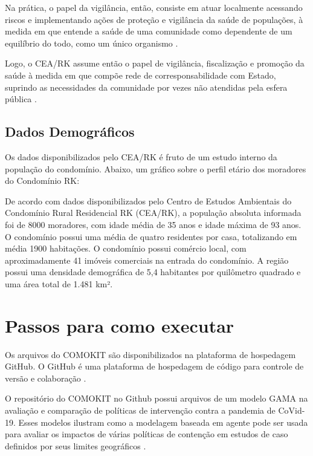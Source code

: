 Na prática, o papel da vigilância, então, consiste em atuar localmente acessando riscos e implementando ações de proteção e vigilância da saúde de populações, à medida em que entende a saúde de uma comunidade como dependente de um equilíbrio do todo, como um único organismo \cite{romao2019aspectos}.

Logo, o CEA/RK assume então o papel de vigilância, fiscalização e promoção da saúde à medida em que compõe rede de corresponsabilidade com Estado, suprindo as necessidades da comunidade por vezes não atendidas pela esfera pública \cite{miranda2020acompanhamento}.

\subsection{Dados Demográficos}

Os dados disponibilizados pelo CEA/RK é fruto de um estudo interno da população do condomínio. Abaixo, um gráfico sobre o perfil etário dos moradores do Condomínio RK:


De acordo com dados disponibilizados pelo Centro de Estudos Ambientais do Condomínio Rural Residencial RK (CEA/RK), a população absoluta informada foi de 8000 moradores, com idade média de 35 anos e idade máxima de 93 anos. O condomínio possui uma média de quatro residentes por casa, totalizando em média 1900 habitações. O condomínio possui comércio local, com aproximadamente 41 imóveis comerciais na entrada do condomínio. A região possui uma densidade demográfica de 5,4 habitantes por quilômetro quadrado e uma área total de 1.481 km².

\section{Passos para como executar}

Os arquivos do COMOKIT são disponibilizados na plataforma de hospedagem GitHub. O GitHub é uma plataforma de hospedagem de código para controle de versão e colaboração \cite{githubdocumentation:online}.

O repositório do COMOKIT no Github possui arquivos de um modelo GAMA na avaliação e comparação de políticas de intervenção contra a pandemia de CoVid-19. Esses modelos ilustram como a modelagem baseada em agente pode ser usada para avaliar os impactos de várias políticas de contenção em estudos de caso definidos por seus limites geográficos \cite{GithubCOMOKIT:online}.

